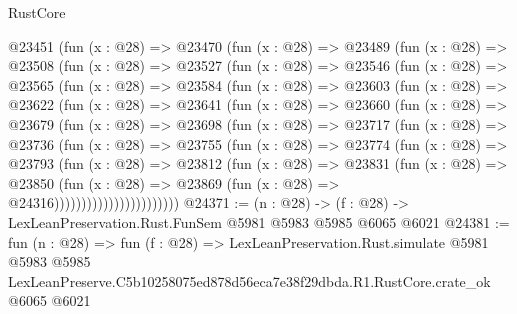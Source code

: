 \begin{lexlean}{RustCore}
\begin{coremodule}
  @23451
    (fun (x : @28) =>
    @23470
      (fun (x : @28) =>
      @23489
        (fun (x : @28) =>
        @23508
          (fun (x : @28) =>
          @23527
            (fun (x : @28) =>
            @23546
              (fun (x : @28) =>
              @23565
                (fun (x : @28) =>
                @23584
                  (fun (x : @28) =>
                  @23603
                    (fun (x : @28) =>
                    @23622
                      (fun (x : @28) =>
                      @23641
                        (fun (x : @28) =>
                        @23660
                          (fun (x : @28) =>
                          @23679
                            (fun (x : @28) =>
                            @23698
                              (fun (x : @28) =>
                              @23717
                                (fun (x : @28) =>
                                @23736
                                  (fun (x : @28) =>
                                  @23755
                                    (fun (x : @28) =>
                                    @23774
                                      (fun (x : @28) =>
                                      @23793
                                        (fun (x : @28) =>
                                        @23812
                                          (fun (x : @28) =>
                                          @23831
                                            (fun (x : @28) =>
                                            @23850
                                              (fun (x : @28) =>
                                              @23869 (fun (x : @28) => @24316)))))))))))))))))))))))
@24371 := (n : @28) -> (f : @28) -> LexLeanPreservation.Rust.FunSem @5981 @5983 @5985 @6065 @6021
@24381 := fun (n : @28) =>
  fun (f : @28) =>
  LexLeanPreservation.Rust.simulate
    @5981
    @5983
    @5985
    LexLeanPreserve.C5b10258075ed878d56eca7e38f29dbda.R1.RustCore.crate_ok
    @6065
    @6021
\end{coremodule}
\end{lexlean}

